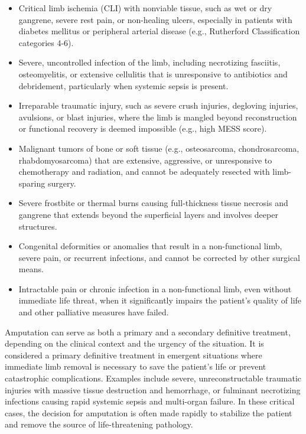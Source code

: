 \begin{itemize}
  \item Critical limb ischemia (CLI) with nonviable tissue, such as wet or dry gangrene, severe rest pain, or non-healing ulcers, especially in patients with diabetes mellitus or peripheral arterial disease (e.g., Rutherford Classification categories 4-6).
  \item Severe, uncontrolled infection of the limb, including necrotizing fasciitis, osteomyelitis, or extensive cellulitis that is unresponsive to antibiotics and debridement, particularly when systemic sepsis is present.
  \item Irreparable traumatic injury, such as severe crush injuries, degloving injuries, avulsions, or blast injuries, where the limb is mangled beyond reconstruction or functional recovery is deemed impossible (e.g., high MESS score).
  \item Malignant tumors of bone or soft tissue (e.g., osteosarcoma, chondrosarcoma, rhabdomyosarcoma) that are extensive, aggressive, or unresponsive to chemotherapy and radiation, and cannot be adequately resected with limb-sparing surgery.
  \item Severe frostbite or thermal burns causing full-thickness tissue necrosis and gangrene that extends beyond the superficial layers and involves deeper structures.
  \item Congenital deformities or anomalies that result in a non-functional limb, severe pain, or recurrent infections, and cannot be corrected by other surgical means.
  \item Intractable pain or chronic infection in a non-functional limb, even without immediate life threat, when it significantly impairs the patient's quality of life and other palliative measures have failed.
\end{itemize}

Amputation can serve as both a primary and a secondary definitive treatment, depending on the clinical context and the urgency of the situation. It is considered a primary definitive treatment in emergent situations where immediate limb removal is necessary to save the patient's life or prevent catastrophic complications. Examples include severe, unreconstructable traumatic injuries with massive tissue destruction and hemorrhage, or fulminant necrotizing infections causing rapid systemic sepsis and multi-organ failure. In these critical cases, the decision for amputation is often made rapidly to stabilize the patient and remove the source of life-threatening pathology.

